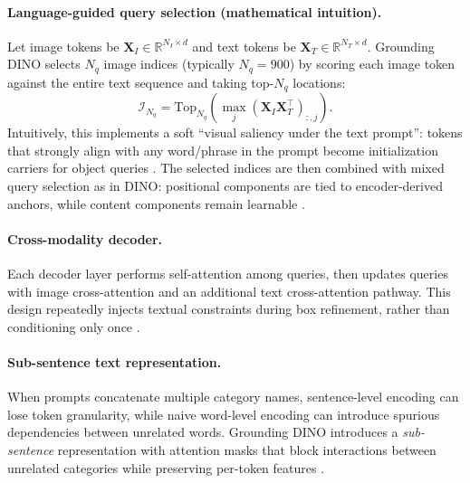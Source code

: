 \paragraph{Language-guided query selection (mathematical intuition).}
Let image tokens be $\mathbf{X}_I\in\mathbb{R}^{N_I\times d}$ and text tokens be $\mathbf{X}_T\in\mathbb{R}^{N_T\times d}$. Grounding DINO selects $N_q$ image indices (typically $N_q=900$) by scoring each image token against the entire text sequence and taking top-$N_q$ locations:
\[
\mathcal{I}_{N_q}=\mathrm{Top}_{N_q}\!\left(\max_{j}(\mathbf{X}_I\mathbf{X}_T^\top)_{:,j}\right).
\]
Intuitively, this implements a soft ``visual saliency under the text prompt'': tokens that strongly align with any word/phrase in the prompt become initialization carriers for object queries \cite{liu2023groundingdino}. The selected indices are then combined with mixed query selection as in DINO: positional components are tied to encoder-derived anchors, while content components remain learnable \cite{liu2023groundingdino}.

\paragraph{Cross-modality decoder.}
Each decoder layer performs self-attention among queries, then updates queries with image cross-attention and an additional text cross-attention pathway. This design repeatedly injects textual constraints during box refinement, rather than conditioning only once \cite{liu2023groundingdino}.

\paragraph{Sub-sentence text representation.}
When prompts concatenate multiple category names, sentence-level encoding can lose token granularity, while naive word-level encoding can introduce spurious dependencies between unrelated words. Grounding DINO introduces a \emph{sub-sentence} representation with attention masks that block interactions between unrelated categories while preserving per-token features \cite{liu2023groundingdino}.


